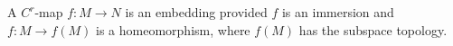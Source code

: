 A $C^r$-map $f: M \to N$ is an embedding provided $f$ is an immersion and $f: M \to f(M)$ is a homeomorphism, where $f(M)$ has the subspace topology.
